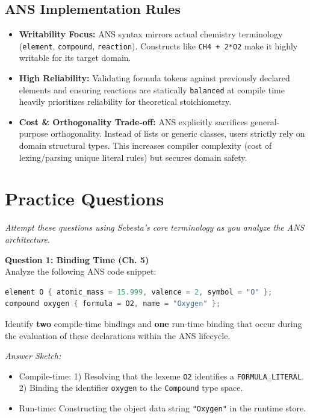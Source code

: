 \documentclass[11pt,a4paper]{article}
\newcommand{\code}[1]{\texttt{#1}}
\begin{document}
\subsection*{ANS Implementation Rules}
\begin{itemize}
    \item \textbf{Writability Focus:} ANS syntax mirrors actual chemistry terminology (\code{element}, \code{compound}, \code{reaction}). Constructs like \code{CH4 + 2*O2} make it highly writable for its target domain.
    \item \textbf{High Reliability:} Validating formula tokens against previously declared elements and ensuring reactions are statically \code{balanced} at compile time heavily prioritizes reliability for theoretical stoichiometry.
    \item \textbf{Cost \& Orthogonality Trade-off:} ANS explicitly sacrifices general-purpose orthogonality. Instead of lists or generic classes, users strictly rely on domain structural types. This increases compiler complexity (cost of lexing/parsing unique literal rules) but secures domain safety.
\end{itemize}

\newpage
\section*{Practice Questions}
\textit{Attempt these questions using Sebesta's core terminology as you analyze the ANS architecture.}

\vspace{10pt}
\textbf{Question 1: Binding Time (Ch. 5)} \\
Analyze the following ANS code snippet:
\begin{lstlisting}[language=C]
element O { atomic_mass = 15.999, valence = 2, symbol = "O" };
compound oxygen { formula = O2, name = "Oxygen" };
\end{lstlisting}
Identify \textbf{two} compile-time bindings and \textbf{one} run-time binding that occur during the evaluation of these declarations within the ANS lifecycle.

\textit{Answer Sketch:} 
\begin{itemize}
    \item Compile-time: 1) Resolving that the lexeme \code{O2} identifies a \code{FORMULA\_LITERAL}. 2) Binding the identifier \code{oxygen} to the \code{Compound} type space.
    \item Run-time: Constructing the object data string \code{"Oxygen"} in the runtime store.
\end{itemize}
\end{document}
